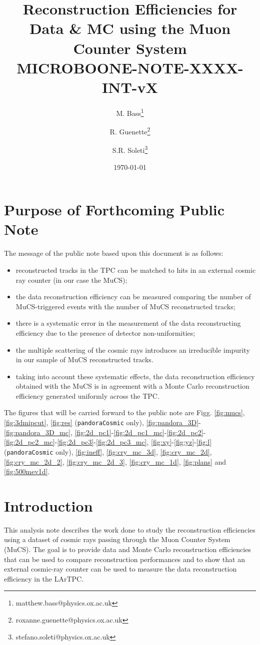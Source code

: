 \documentclass[a4paper]{scrartcl}
\title{Reconstruction Efficiencies for Data \& MC using the Muon Counter System \\ \vspace{1em} \small{\textbf{MICROBOONE-NOTE-XXXX-INT-vX}}}
\author[1]{M. Bass\thanks{matthew.bass@physics.ox.ac.uk}}
\author[1]{R. Guenette\thanks{roxanne.guenette@physics.ox.ac.uk}}
\author[1]{S.R. Soleti\thanks{stefano.soleti@physics.ox.ac.uk}}
\affil[1]{\emph{\small{University of Oxford, Oxford OX1 3RH, United Kingdom}}}
\date{\today}
\begin{document}
\maketitle

\setcounter{section}{-1}

\section{Purpose of Forthcoming Public Note}

The message of the public note based upon this document is as follows:

\begin{itemize}
  \item reconstructed tracks in the TPC can be matched to hits in an external cosmic ray counter (in our case the MuCS);
  \item the data reconstruction efficiency can be measured comparing the number of MuCS-triggered events with the number of MuCS reconstructed tracks;
  \item there is a systematic error in the measurement of the data reconstructing efficiency due to the presence of detector non-uniformities;
  \item the multiple scattering of the cosmic rays introduces an irreducible impurity in our sample of MuCS reconstructed tracks.
  \item taking into account these systematic effects, the data reconstruction efficiency obtained with the MuCS is in agreement with a Monte Carlo reconstruction efficiency generated uniformly across the TPC.

\end{itemize}

The figures that will be carried forward to the public note are Figg. \ref{fig:mucs}, \ref{fig:3dmipcut}, \ref{fig:res} (\texttt{pandoraCosmic} only), \ref{fig:pandora_3D}-\ref{fig:pandora_3D_mc}, \ref{fig:2d_pc1}-\ref{fig:2d_pc1_mc}-\ref{fig:2d_pc2}-\ref{fig:2d_pc2_mc}-\ref{fig:2d_pc3}-\ref{fig:2d_pc3_mc}, \ref{fig:xy}-\ref{fig:yz}-\ref{fig:l}  (\texttt{pandoraCosmic} only), \ref{fig:ineff}, \ref{fig:cry_mc_3d}, \ref{fig:cry_mc_2d}, \ref{fig:cry_mc_2d_2}, \ref{fig:cry_mc_2d_3}, \ref{fig:cry_mc_1d}, \ref{fig:plans} and \ref{fig:500mev1d}.

\section{Introduction}
This analysis note describes the work done to study the reconstruction efficiencies using a dataset of cosmic rays passing through the Muon Counter System (MuCS).
The goal is to provide data and Monte Carlo reconstruction efficiencies that can be used to compare reconstruction performances and to show that an external cosmic-ray counter can be used to measure the data reconstruction efficiency in the LArTPC.
\end{document}
